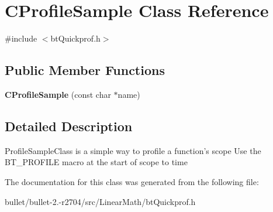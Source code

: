 \hypertarget{class_c_profile_sample}{\section{C\+Profile\+Sample Class Reference}
\label{class_c_profile_sample}
}


{\ttfamily \#include $<$bt\+Quickprof.\+h$>$}

\subsection*{Public Member Functions}
\begin{DoxyCompactItemize}
\item 
\hypertarget{class_c_profile_sample_a63b5cb0514619d4f21e67fa9095752d7}{{\bfseries C\+Profile\+Sample} (const char $\ast$name)}\label{class_c_profile_sample_a63b5cb0514619d4f21e67fa9095752d7}

\end{DoxyCompactItemize}


\subsection{Detailed Description}
Profile\+Sample\+Class is a simple way to profile a function's scope Use the B\+T\+\_\+\+P\+R\+O\+F\+I\+L\+E macro at the start of scope to time 

The documentation for this class was generated from the following file\+:\begin{DoxyCompactItemize}
\item 
bullet/bullet-\/2.-\/r2704/src/\+Linear\+Math/bt\+Quickprof.\+h\end{DoxyCompactItemize}
